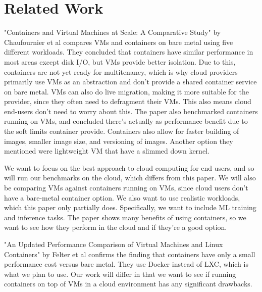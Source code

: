 \documentclass[11pt]{article}
\begin{document}
\section{Related Work}


"Containers and Virtual Machines at Scale: A Comparative Study" by Chaufournier et al compares VMs and containers on bare metal using five different workloads. They concluded that containers have similar performance in most areas except disk I/O, but VMs provide better isolation. Due to this, containers are not yet ready for multitenancy, which is why cloud providers primarily use VMs as an abstraction and don't provide a shared container service on bare metal. VMs can also do live migration, making it more suitable for the provider, since they often need to defragment their VMs. This also means cloud end-users don't need to worry about this. The paper also benchmarked containers running on VMs, and concluded there's actually as performance benefit due to the soft limits container provide. Containers also allow for faster building of images, smaller image size, and versioning of images. Another option they mentioned were lightweight VM that have a slimmed down kernel.

We want to focus on the best approach to cloud computing for end users, and so will run our benchmarks on the cloud, which differs from this paper. We will also be comparing VMs against containers running on VMs, since cloud users don't have a bare-metal container option. We also want to use realistic workloads, which this paper only partially does. Specifically, we want to include ML training and inference tasks. The paper shows many benefits of using containers, so we want to see how they perform in the cloud and if they're a good option.

"An Updated Performance Comparison of Virtual Machines and Linux Containers" by Felter et al confirms the finding that containers have only a small performance cost versus bare metal. They use Docker instead of LXC, which is what we plan to use. Our work will differ in that we want to see if running containers on top of VMs in a cloud environment has any significant drawbacks.
\end{document}

